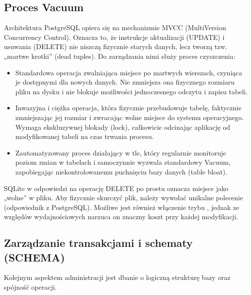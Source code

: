 \documentclass[letterpaper,10pt,polish]{sphinxmanual}
\begin{document}
\subsection{Proces Vacuum}
\label{\detokenize{rozdzia_u0142_2/rozdzia_u0142_23/index:proces-vacuum}}
\sphinxAtStartPar
Architektura PostgreSQL opiera się na mechanizmie MVCC (Multi\sphinxhyphen{}Version Concurrency Control). Oznacza to, że instrukcje aktualizacji (UPDATE) i usuwania (DELETE) nie niszczą fizycznie starych danych, lecz tworzą tzw. „martwe krotki” (dead tuples). Do zarządzania nimi służy proces czyszczenia:
\begin{itemize}
\item {} 
\sphinxAtStartPar
{} Standardowa operacja zwalniająca miejsce po martwych wierszach, czyniąca je dostępnymi dla nowych danych. Nie zmniejsza ona fizycznego rozmiaru pliku na dysku i nie blokuje możliwości jednoczesnego odczytu i zapisu tabeli.

\item {} 
\sphinxAtStartPar
{} Inwazyjna i ciężka operacja, która fizycznie przebudowuje tabelę, faktycznie zmniejszając jej rozmiar i zwracając wolne miejsce do systemu operacyjnego. Wymaga ekskluzywnej blokady (lock), całkowicie odcinając aplikację od modyfikowanej tabeli na czas trwania procesu.

\item {} 
\sphinxAtStartPar
{} Zautomatyzowany proces działający w tle, który regularnie monitoruje poziom zmian w tabelach i samoczynnie wyzwala standardowy Vacuum, zapobiegając niekontrolowanemu puchnięciu bazy danych (table bloat).

\end{itemize}

\sphinxAtStartPar
{} SQLite w odpowiedzi na operację DELETE po prostu oznacza miejsce jako „wolne” w pliku. Aby fizycznie skurczyć plik, należy wywołać unikalne polecenie  (odpowiednik  z PostgreSQL). Możliwe jest również włączenie trybu , jednak ze względów wydajnościowych narzuca on znaczny koszt przy każdej modyfikacji.


\subsection{Zarządzanie transakcjami i schematy (SCHEMA)}
\label{\detokenize{rozdzia_u0142_2/rozdzia_u0142_23/index:zarzadzanie-transakcjami-i-schematy-schema}}
\sphinxAtStartPar
Kolejnym aspektem administracji jest dbanie o logiczną strukturę bazy oraz spójność operacji.
\end{document}
